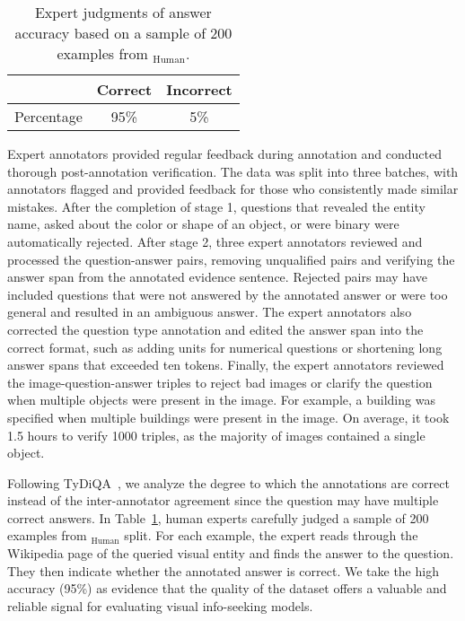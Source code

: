 \documentclass[11pt]{article}
\begin{document}
\begin{table}
\centering
\small
\begin{tabular}{ccc}
\toprule
& Correct & Incorrect \\
\midrule
Percentage & 95\% & 5\% \\
\bottomrule
\end{tabular}
\caption{Expert judgments of answer accuracy based on a sample of 200 examples from \infoseek$_{\text{Human}}$.}
\label{tab:expert_feedback}
\vspace{-5mm}
\end{table}

Expert annotators provided regular feedback during annotation and conducted thorough post-annotation verification. The data was split into three batches, with annotators flagged and provided feedback for those who consistently made similar mistakes. After the completion of stage 1, questions that revealed the entity name, asked about the color or shape of an object, or were binary were automatically rejected. After stage 2, three expert annotators reviewed and processed the question-answer pairs, removing unqualified pairs and verifying the answer span from the annotated evidence sentence. Rejected pairs may have included questions that were not answered by the annotated answer or were too general and resulted in an ambiguous answer. The expert annotators also corrected the question type annotation and edited the answer span into the correct format, such as adding units for numerical questions or shortening long answer spans that exceeded ten tokens. 
Finally, the expert annotators reviewed the image-question-answer triples to reject bad images or clarify the question when multiple objects were present in the image. For example, a building was specified when multiple buildings were present in the image. On average, it took 1.5 hours to verify 1000 triples, as the majority of images contained a single object.

Following TyDiQA~\citep{clark2020tydi}, we analyze the degree to which the annotations are correct instead of the inter-annotator agreement since the question may have multiple correct answers. In Table~\ref{tab:expert_feedback}, human experts carefully judged a sample of 200 examples from \infoseek$_\text{Human}$ split. For each example, the expert reads through the Wikipedia page of the queried visual entity and finds the answer to the question. They then indicate whether the annotated answer is correct.
We take the high accuracy (95\%) as evidence that the quality of the dataset offers a valuable and reliable signal for evaluating visual info-seeking models.
\end{document}
